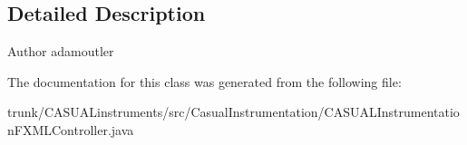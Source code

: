 \subsection{Detailed Description}
\begin{DoxyAuthor}{Author}
adamoutler 
\end{DoxyAuthor}


The documentation for this class was generated from the following file\-:\begin{DoxyCompactItemize}
\item 
trunk/\-C\-A\-S\-U\-A\-Linstruments/src/\-Casual\-Instrumentation/C\-A\-S\-U\-A\-L\-Instrumentation\-F\-X\-M\-L\-Controller.\-java\end{DoxyCompactItemize}

